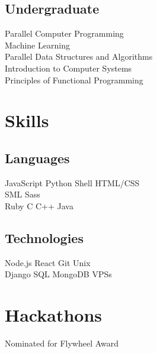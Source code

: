 \documentclass[hidelinks]{deedy-resume-openfont}
\begin{document}
\begin{minipage}[t]{0.33\textwidth}
\subsection{Undergraduate}
Parallel Computer Programming\\
Machine Learning\\
Parallel Data Structures and Algorithms\\
Introduction to Computer Systems\\
Principles of Functional Programming\\
\sectionsep


\section{Skills}
\subsection{Languages}
JavaScript \textbullet{} Python \textbullet{} Shell \textbullet{}  HTML/CSS \\
SML \textbullet{} Sass \\
Ruby \textbullet{} C \textbullet{} C++ \textbullet{} Java \\
\sectionsep

\subsection{Technologies}
Node.js \textbullet{} React \textbullet{} Git \textbullet{} Unix \\
Django \textbullet{} SQL \textbullet{} MongoDB \textbullet{} VPSs
\sectionsep


\section{Hackathons}
\vspace{\topsep} %
\begin{tightemize}
\item Nominated for Flywheel Award
\end{tightemize}


\end{minipage}
\end{document}
